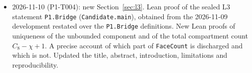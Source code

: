 \documentclass[11pt]{article}
\theoremstyle{definition}
\theoremstyle{remark}
\begin{document}
\begin{itemize}
  equation $\mathrm{enc}=C_8-\chi$ (\texttt{bridge\_eq}). Updated the title, abstract,
  introduction, Table~\ref{tab:scan}, limitations and reproducibility.
\item 2026-11-10 (P1-T004): new Section~\ref{sec:l3}. Lean proof of the sealed L3
  statement \texttt{P1.Bridge} (\texttt{Candidate.main}), obtained from the 2026-11-09 development
  restated over the \texttt{P1.Bridge} definitions. New Lean proofs of uniqueness of the
  unbounded component and of the total compartment count $C_8-\chi+1$. A precise account
  of which part of \texttt{FaceCount} is discharged and which is not. Updated the title, abstract,
  introduction, limitations and reproducibility.
\end{itemize}



\end{document}
